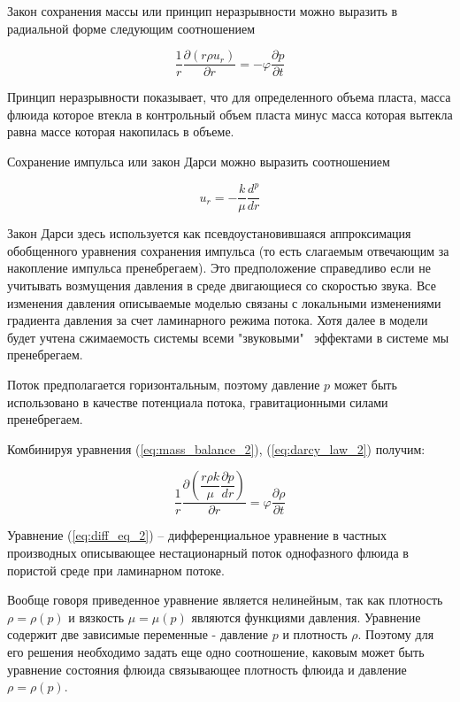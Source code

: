 Закон сохранения массы или принцип неразрывности можно выразить в радиальной форме следующим соотношением

\begin{equation} \label{eq:mass_balance_2}
\frac{1}{r}\frac{\partial\left(r\rho u_r\right)}{\partial r}=-\varphi\frac{\partial p}{\partial t}
\end{equation}

Принцип неразрывности показывает, что для определенного объема пласта, масса флюида которое втекла в контрольный объем пласта минус масса которая вытекла равна массе которая накопилась в объеме. 

Сохранение импульса или закон Дарси можно выразить соотношением  


\begin{equation} \label{eq:darcy_law_2}
 u_r=-\frac{k}{\mu}\frac{d^p}{dr}
\end{equation}

Закон Дарси здесь используется как псевдоустановившаяся аппроксимация обобщенного уравнения сохранения импульса (то есть слагаемым отвечающим за накопление импульса пренебрегаем). Это предположение справедливо если не учитывать возмущения давления в среде двигающиеся со скоростью звука. Все изменения давления описываемые моделью связаны с локальными изменениями градиента давления за счет ламинарного режима потока. Хотя далее в модели будет учтена сжимаемость системы всеми "звуковыми" \ эффектами в системе мы пренебрегаем.

Поток предполагается горизонтальным, поэтому давление \( p\) может быть использовано в качестве потенциала потока, гравитационными силами пренебрегаем.

Комбинируя уравнения (\ref{eq:mass_balance_2}), (\ref{eq:darcy_law_2})  получим:

\begin{equation} \label{eq:diff_eq_2}
\frac{1}{r}\frac{\partial\left( \dfrac{r\rho k}{\mu}\dfrac{\partial p}{dr}\right)}{\partial r}=\varphi\frac{\partial \rho}{\partial t}
\end{equation}

Уравнение (\ref{eq:diff_eq_2}) -- дифференциальное уравнение в частных производных описывающее нестационарный поток однофазного флюида в пористой среде при ламинарном потоке. 

Вообще говоря приведенное уравнение является нелинейным, так как плотность $\rho = \rho(p)$ и вязкость $\mu = \mu(p)$ являются функциями давления. Уравнение содержит две зависимые переменные - давление $p$ и плотность $\rho$. Поэтому для его решения необходимо задать еще одно соотношение, каковым может быть уравнение состояния флюида связывающее плотность флюида и давление $\rho = \rho(p)$. 

